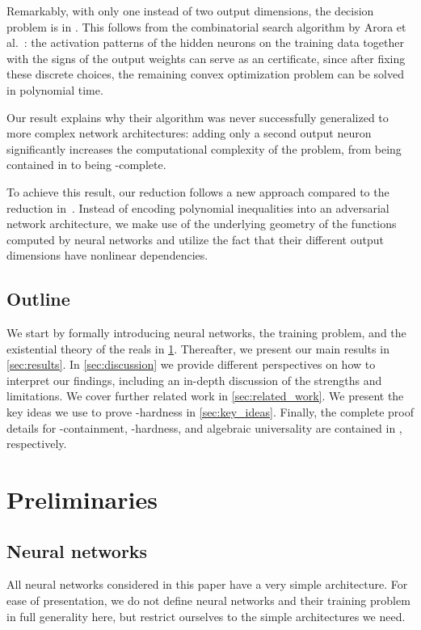 Remarkably, with only one instead of two output dimensions, the
%
decision
%
problem is in \NP.
%
%
%
%
%
This follows from the combinatorial search algorithm by Arora et al.~\cite{Arora2018_Understanding}: the activation patterns of the hidden neurons on the training data together with the signs of the output weights can serve as an \NP{} certificate, since after fixing these discrete choices, the remaining convex optimization problem can be solved in polynomial time.
%

%
Our result explains why their algorithm was never successfully generalized to more complex network
architectures: adding only a second output neuron significantly increases the computational
complexity of the problem, from being contained in \NP{} to being \ER-complete.

To achieve this result, our reduction follows a %
%
%
%
new  %
approach compared to the reduction in~\cite{Abrahamsen2021_NeuralNetworks}.
%
%
Instead of encoding polynomial inequalities into an adversarial network architecture, we make use of the underlying geometry of the functions computed by \twolayer neural networks and utilize the fact that their different output dimensions have nonlinear dependencies.

\subsection{Outline}
We start by formally introducing neural networks, the training problem, and the existential theory of the reals in \cref{sec:preliminaries}.
Thereafter, we present our main results in \cref{sec:results}.
In \cref{sec:discussion} we provide different perspectives on how to interpret our findings, including an in-depth discussion of the strengths and limitations.
We cover further related work in \cref{sec:related_work}.
We present the key ideas we use to prove \ER-hardness in \cref{sec:key_ideas}.
Finally, the complete proof details for \ER-containment, \ER-hardness, and algebraic universality are contained in , respectively.



\section{Preliminaries}
\label{sec:preliminaries}

\subsection{Neural networks}
All neural networks considered in this paper have a very simple architecture.
For ease of presentation, we do not define neural networks and their training problem in full generality here, but restrict ourselves to the simple architectures we need.

